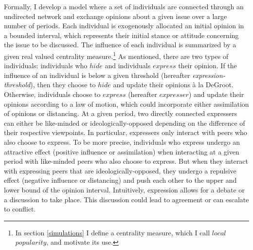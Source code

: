 \documentclass{article}
\begin{document}
Formally, I develop a model where a set of individuals are connected through an undirected network and exchange opinions about a given issue over a large number of periods. Each individual is exogenously allocated an initial opinion in a bounded interval, which represents their initial stance or attitude concerning the issue to be discussed. The influence of each individual is summarized by a given real valued centrality measure.\footnote{In section \ref{simulations} I define a centrality measure, which I call $local$ $popularity$, and motivate its use.} As mentioned, there are two types of individuals: individuals who $hide$ and individuals $express$ their opinion. If the influence of an individual is below a given threshold (hereafter \textit{expression-threshold}), then they choose to $hide$ and update their opinions \`{a} la DeGroot. Otherwise, individuals choose to $express$ (hereafter $expresser$) and update their opinions according to a law of motion, which could incorporate either assimilation of opinions or distancing. At a given period, two directly connected expressers can either be like-minded or ideologically-opposed depending on the difference of their respective viewpoints. In particular, expressers only interact with peers who also choose to express. To be more precise, individuals who express undergo an attractive effect (positive influence or assimilation) when interacting at a given period with like-minded peers who also choose to express. But when they interact with expressing peers that are ideologically-opposed, they undergo a repulsive effect (negative influence or distancing) and push each other to the upper and lower bound of the opinion interval. Intuitively, expression allows for a debate or a discussion to take place. This discussion could lead to agreement or can escalate to conflict. 
\bigskip

\bigskip
\end{document}
